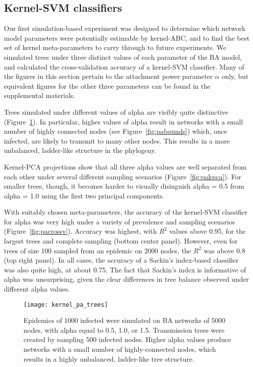 \subsection{Kernel-SVM classifiers}

Our first simulation-based experiment was designed to determine which network
model parameters were potentially estimable by kernel-\gls{ABC}, and to find
the best set of kernel meta-parameters to carry through to future experiments.
We simulated trees under three distinct values of each parameter of the
\gls{BA} model, and calculated the cross-validation accuracy of a
kernel-\gls{SVM} classifier. Many of the figures in this section pertain to the
attachment power parameter $\alpha$ only, but equivalent figures for the other
three parameters can be found in the supplemental materials.

Trees simulated under different values of \gls{alpha} are visibly quite
distinctive (Figure~\ref{fig:patrees}). In particular, higher values of
\gls{alpha} result in networks with a small number of highly connected nodes
(see Figure~\ref{fig:pabounds}) which, once infected, are likely to transmit to
many other nodes. This results in a more unbalanced, ladder-like structure in
the phylogeny. 


Kernel-\gls{PCA} projections show that all three \gls{alpha} values are well
separated from each other under several different sampling scenarios
(Figure~\ref{fig:pakpca}). For smaller trees, though, it becomes harder to
visually disinguish \gls{alpha} = 0.5 from \gls{alpha} = 1.0 using the first
two principal components.

With suitably chosen meta-parameters, the accuracy of the kernel-\gls{SVM}
classifier for \gls{alpha} was very high under a variety of prevalence and
sampling scenarios (Figure~\ref{fig:pacrossv}). Accuracy was highest, with
$R^2$ values above 0.95, for the largest trees and complete sampling (bottom
center panel). However, even for trees of size 100 sampled from an epidemic on
2000 nodes, the $R^2$ was above 0.8 (top right panel). In all cases, the
accuracy of a Sackin's index-based classifier was also quite high, at about
0.75. The fact that Sackin's index is informative of \gls{alpha} was
unsurprising, given the clear differences in tree balance observed under
different \gls{alpha} values. 

\begin{figure}[ht]
  \centering
  \label{fig:patrees}
  \texttt{[image: kernel\_pa\_trees]}
  \caption[Visibly distinctive trees simulated under three values of \gls{alpha}]{
    Epidemics of 1000 infected were simulated on \gls{BA} networks of 5000
    nodes, with \gls{alpha} equal to 0.5, 1.0, or 1.5. Transmission trees were
    created by sampling 500 infected nodes. Higher \gls{alpha} values produce
    networks with a small number of highly-connected nodes, which results in a
    highly unbalanced, ladder-like tree structure.
  }
\end{figure}

